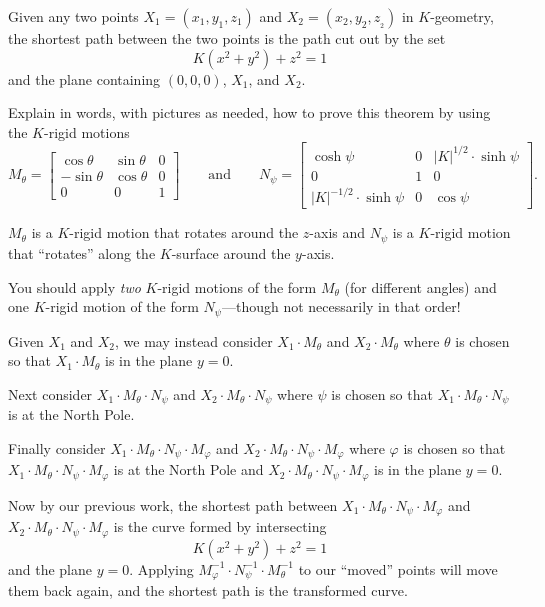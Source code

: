 \documentclass{ximera}
\begin{document}
\begin{theorem}
Given any two points $X_{1}=\left(x_{1},y_{1},z_{1}\right) $ and
$X_{2}=\left(x_{2},y_{2},z_{_{2}}\right) $ in $K$-geometry, the
shortest path between the two points is the path cut out by the set
\[
K\left(  x^{2}+y^{2}\right)  +z^{2}=1
\]
and the plane containing $(0,0,0)$, $X_{1}$, and $X_{2}$.
\end{theorem}


\begin{problem}
  Explain in words, with pictures as needed, how to prove this theorem
  by using the $K$-rigid motions
  \[
  M_\theta=
  \begin{bmatrix}
    \cos\theta & \sin\theta & 0\\
    -\sin\theta & \cos\theta & 0\\
    0 & 0 & 1
  \end{bmatrix}
  \qquad\text{and}\qquad
  N_\psi=
  \begin{bmatrix}
    \cosh\psi & 0 & |K|^{1/2}\cdot\sinh\psi\\
    0 & 1 & 0\\
    |K|^{-1/2}\cdot\sinh\psi & 0 & \cos\psi
  \end{bmatrix}.
  \]
  \begin{hint}
    $M_\theta$ is a $K$-rigid motion that rotates around the $z$-axis
    and $N_\psi$ is a $K$-rigid motion that ``rotates'' along the
    $K$-surface around the $y$-axis.
  \end{hint}
  \begin{hint}
    You should apply \textit{two} $K$-rigid motions of the form
    $M_\theta$ (for different angles) and one $K$-rigid motion of the
    form $N_\psi$---though not necessarily in that order!
  \end{hint}
  \begin{freeResponse}
    Given $X_1$ and $X_2$, we may instead consider $X_1\cdot M_\theta$
    and $X_2\cdot M_\theta$ where $\theta$ is chosen so that $X_1\cdot
    M_\theta$ is in the plane $y=0$.

    Next consider $X_1\cdot M_\theta\cdot N_\psi$ and $X_2\cdot
    M_\theta\cdot N_\psi$ where $\psi$ is chosen so that $X_1\cdot
    M_\theta\cdot N_\psi$ is at the North Pole.

    Finally consider $X_1\cdot M_\theta\cdot N_\psi\cdot M_\varphi$
    and $X_2\cdot M_\theta\cdot N_\psi\cdot M_\varphi$ where $\varphi$
    is chosen so that $X_1\cdot M_\theta\cdot N_\psi\cdot M_\varphi$
    is at the North Pole and $X_2\cdot M_\theta\cdot N_\psi\cdot
    M_\varphi$ is in the plane $y=0$.

    Now by our previous work, the shortest path between $X_1\cdot
    M_\theta\cdot N_\psi\cdot M_\varphi$ and $X_2\cdot M_\theta\cdot
    N_\psi\cdot M_\varphi$ is the curve formed by intersecting
    \[
    K(x^2+y^2)+z^2=1
    \]
    and the plane $y=0$. Applying $M_\varphi^{-1}\cdot
    N_\psi^{-1}\cdot M_\theta^{-1}$ to our ``moved'' points will move
    them back again, and the shortest path is the transformed curve.
  \end{freeResponse}
\end{problem}
\end{document}
